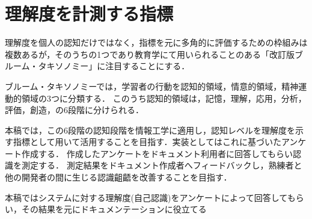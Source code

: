 \section{理解度を計測する指標}
理解度を個人の認知だけではなく，指標を元に多角的に評価するための枠組みは複数あるが，そのうちの1つであり教育学にて用いられることのある「改訂版ブルーム・タキソノミー」\cite{bib:anderson}に注目することにする．

ブルーム・タキソノミーでは，学習者の行動を認知的領域，情意的領域，精神運動的領域の3つに分類する．
このうち認知的領域は，記憶，理解，応用，分析，評価，創造，の6段階に分けられる．

本稿では，この6段階の認知段階を情報工学に適用し，認知レベルを理解度を示す指標として用いて活用することを目指す．実装としてはこれに基づいたアンケート作成する．
作成したアンケートをドキュメント利用者に回答してもらい認識を測定する．
測定結果をドキュメント作成者へフィードバックし，熟練者と他の開発者の間に生じる認識齟齬を改善することを目指す．

本稿ではシステムに対する理解度(自己認識)をアンケートによって回答してもらい，その結果を元にドキュメンテーションに役立てる
